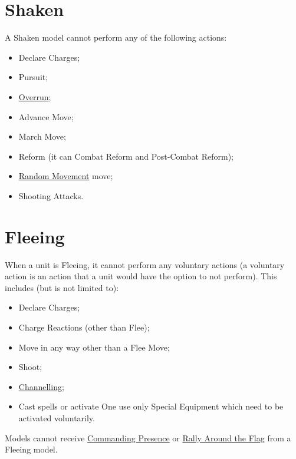\section{Shaken}
\label{shaken}

A Shaken model cannot perform any of the following actions:

\begin{itemize}[label={-}]
\item Declare Charges;
\item Pursuit;
\item \hyperref[overrun]{Overrun};
\item Advance Move;
\item March Move;
\item Reform (it can Combat Reform and Post-Combat Reform);
\item \hyperref[random_movement]{Random Movement} move;
\item Shooting Attacks.
\end{itemize}

\newpage
\section{Fleeing}
\label{fleeing}

When a unit is Fleeing, it cannot perform any voluntary actions (a voluntary action is an action that a unit would have the option to not perform). This includes (but is not limited to):

\begin{itemize}[label={-}]
\item Declare Charges;
\item Charge Reactions (other than Flee);
\item Move in any way other than a Flee Move;
\item Shoot;
\item \hyperref[channel]{Channelling};
\item Cast spells or activate One use only Special Equipment which need to be activated voluntarily.
\end{itemize}

Models cannot receive \hyperref[commanding_presence]{Commanding Presence} or \hyperref[rally_around_the_flag]{Rally Around the Flag} from a Fleeing model.